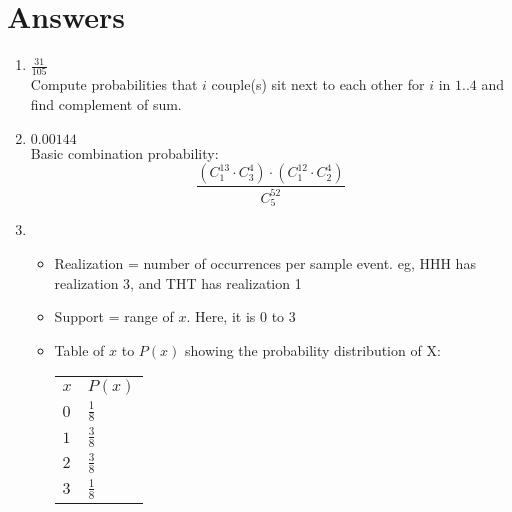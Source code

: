 \documentclass[12pt]{article}
\begin{document}
\section{Answers}
\begin{enumerate}
	\item $\frac{31}{105}$ \\
	Compute probabilities that $i$ couple(s) sit next to each other for $i$ in $1..4$ and find complement of sum.
	\item $0.00144$ \\
	Basic combination probability: $$\frac{(C_1^{13} \cdot C_3^4) \cdot (C_1^{12} \cdot C_2^4)}{C_5^{52}}$$
	\item 
	\begin{itemize}
		\item Realization = number of occurrences per sample event. eg, HHH has realization 3, and THT has realization 1
		\item Support = range of $x$. Here, it is 0 to 3
		\item Table of $x$ to $P(x)$ showing the probability distribution of X: \\
		\begin{tabular}{l | l}
			$x$ & $P(x)$ \\
			$0$ & $\frac{1}{8}$ \\
			$1$ & $\frac{3}{8}$ \\
			$2$ & $\frac{3}{8}$ \\
			$3$ & $\frac{1}{8}$
		\end{tabular}
	\end{itemize}
\end{enumerate}
\end{document}
